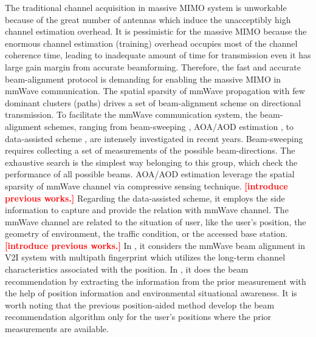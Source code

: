 \documentclass[12pt, draftcls, onecolumn]{IEEEtran}
\theoremstyle{plain}
\theoremstyle{definition}
\theoremstyle{remark}
\newcommand{\nt}[1]{\textcolor{red}{\textbf{[#1]}}}
\begin{document}
The traditional channel acquisition in massive MIMO system is unworkable because of the great number of antennas which induce the unacceptibly high channel estimation overhead.
It is pessimistic for the massive MIMO because the enormous channel estimation (training) overhead occupies most of the channel coherence time, leading to inadequate amount of time for transmission even it has large gain margin from accurate beamforming.
Therefore, the fast and accurate beam-alignment protocol is demanding for enabling the massive MIMO in mmWave communication.
The spatial sparsity of mmWave propagation with few dominant clusters (paths) drives a set of beam-alignment scheme on directional transmission.
To facilitate the mmWave communication system, the beam-alignment schemes, ranging from beam-sweeping \cite{8573158}, AOA/AOD estimation \cite{6847111,7390019}, to data-assisted scheme \cite{7952807,Va2018, 8445969}, are intensely investigated in recent years.
Beam-sweeping requires collecting a set of measurements of the possible beam-directions.
The exhaustive search is the simplest way belonging to this group, which check the performance of all possible beams.
AOA/AOD estimation leverage the spatial sparsity of mmWave channel via compressive sensing technique. \nt{introduce previous works.}
Regarding the data-assisted scheme, it employs the side information to capture and provide the relation with mmWave channel.
The mmWave channel are related to the situation of user, like the user's position, the geometry of environment, the traffic condition, or the accessed base station.
\nt{introduce previous works.}
In \cite{Va2018}, it considers the mmWave beam alignment in V2I system with multipath fingerprint which utilizes the long-term channel characteristics associated with the position.
In \cite{8445969}, it does the beam recommendation by extracting the information from the prior measurement with the help of position information and environmental situational awareness.
It is worth noting that the previous position-aided method develop the beam recommendation algorithm only for the user's positions where the prior measurements are available.
\end{document}
